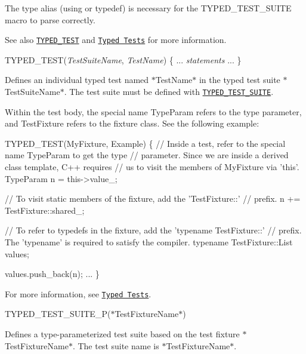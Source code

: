 The type alias ({\ttfamily using} or {\ttfamily typedef}) is necessary for the {\ttfamily T\+Y\+P\+E\+D\+\_\+\+T\+E\+S\+T\+\_\+\+S\+U\+I\+TE} macro to parse correctly.

See also \href{#TYPED_TEST}{\tt {\ttfamily T\+Y\+P\+E\+D\+\_\+\+T\+E\+ST}} and \href{../advanced.md#typed-tests}{\tt Typed Tests} for more information.


\begin{DoxyPre}
TYPED\_TEST({\itshape TestSuiteName}, {\itshape TestName}) \{
  ... {\itshape statements} ...
\}
\end{DoxyPre}


Defines an individual typed test named $\ast${\ttfamily Test\+Name}$\ast$ in the typed test suite $\ast${\ttfamily Test\+Suite\+Name}$\ast$. The test suite must be defined with \href{#TYPED_TEST_SUITE}{\tt {\ttfamily T\+Y\+P\+E\+D\+\_\+\+T\+E\+S\+T\+\_\+\+S\+U\+I\+TE}}.

Within the test body, the special name {\ttfamily Type\+Param} refers to the type parameter, and {\ttfamily Test\+Fixture} refers to the fixture class. See the following example\+:


\begin{DoxyCode}
TYPED\_TEST(MyFixture, Example) \{
  \textcolor{comment}{// Inside a test, refer to the special name TypeParam to get the type}
  \textcolor{comment}{// parameter.  Since we are inside a derived class template, C++ requires}
  \textcolor{comment}{// us to visit the members of MyFixture via 'this'.}
  TypeParam n = this->value\_;

  \textcolor{comment}{// To visit static members of the fixture, add the 'TestFixture::'}
  \textcolor{comment}{// prefix.}
  n += TestFixture::shared\_;

  \textcolor{comment}{// To refer to typedefs in the fixture, add the 'typename TestFixture::'}
  \textcolor{comment}{// prefix. The 'typename' is required to satisfy the compiler.}
  \textcolor{keyword}{typename} TestFixture::List values;

  values.push\_back(n);
  ...
\}
\end{DoxyCode}


For more information, see \href{../advanced.md#typed-tests}{\tt Typed Tests}.

{\ttfamily T\+Y\+P\+E\+D\+\_\+\+T\+E\+S\+T\+\_\+\+S\+U\+I\+T\+E\+\_\+P(}$\ast${\ttfamily Test\+Fixture\+Name}$\ast${\ttfamily )}

Defines a type-\/parameterized test suite based on the test fixture $\ast${\ttfamily Test\+Fixture\+Name}$\ast$. The test suite name is $\ast${\ttfamily Test\+Fixture\+Name}$\ast$.

